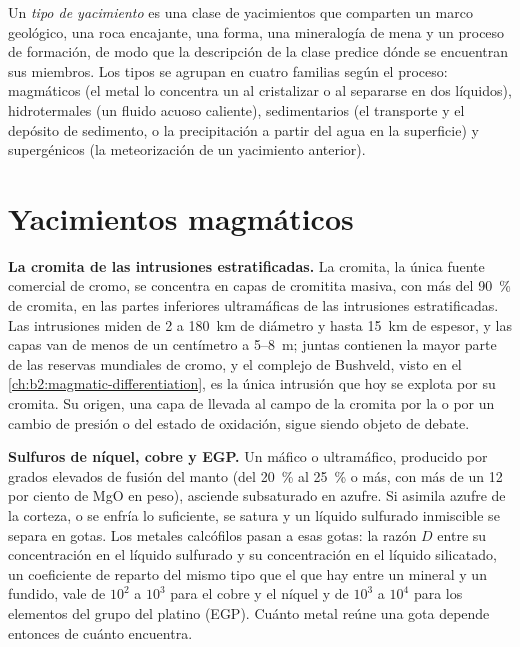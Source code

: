 \begin{definition}\label{def:b2:ore-deposits:types}
Un \emph{tipo de yacimiento} es una clase de yacimientos que comparten un marco
geológico, una roca encajante, una forma, una mineralogía de mena y un proceso de formación, de modo que la descripción de
la clase predice dónde se encuentran sus miembros. Los tipos se agrupan en cuatro familias según el proceso:
magmáticos (el metal lo concentra un  al cristalizar o al separarse en dos líquidos),
hidrotermales (un fluido acuoso caliente), sedimentarios (el transporte y el depósito
de sedimento, o la precipitación a partir del agua en la superficie) y supergénicos (la meteorización
de un yacimiento anterior).
\end{definition}

\section{Yacimientos magmáticos}\label{sec:b2:ore-deposits:magmatic}

\textbf{La cromita de las intrusiones estratificadas.} La cromita, la única fuente comercial de cromo,
se concentra en capas de cromitita masiva, con más del \qty{90}{\percent} de cromita, en las partes inferiores
ultramáficas de las intrusiones estratificadas. Las intrusiones miden de 2 a \qty{180}{km} de diámetro y hasta
\qty{15}{km} de espesor, y las capas van de menos de un centímetro a 5--\qty{8}{m}; juntas
contienen la mayor parte de las reservas mundiales de cromo, y el complejo de Bushveld, visto en el
\cref{ch:b2:magmatic-differentiation}, es la única intrusión que hoy se explota por su cromita. Su origen, una
capa de  llevada al campo de la cromita por la  o por un cambio de presión o del
estado de oxidación, sigue siendo objeto de debate.

\textbf{Sulfuros de níquel, cobre y EGP.} Un  máfico o ultramáfico, producido por grados elevados de
fusión del manto (del \qty{20}{\percent} al \qty{25}{\percent} o más, con más de un 12 por ciento de MgO en
peso), asciende subsaturado en azufre. Si asimila azufre de la corteza, o se enfría lo
suficiente, se satura y un líquido sulfurado inmiscible se separa en gotas. Los
metales calcófilos pasan a esas gotas: la razón $D$ entre su concentración en el líquido sulfurado
y su concentración en el líquido silicatado, un coeficiente de reparto del mismo tipo que el que hay entre un
mineral y un fundido, vale de $10^2$ a $10^3$ para el cobre y el níquel y de $10^3$ a $10^4$ para los
elementos del grupo del platino (EGP). Cuánto metal reúne una gota depende entonces de cuánto  encuentra.

